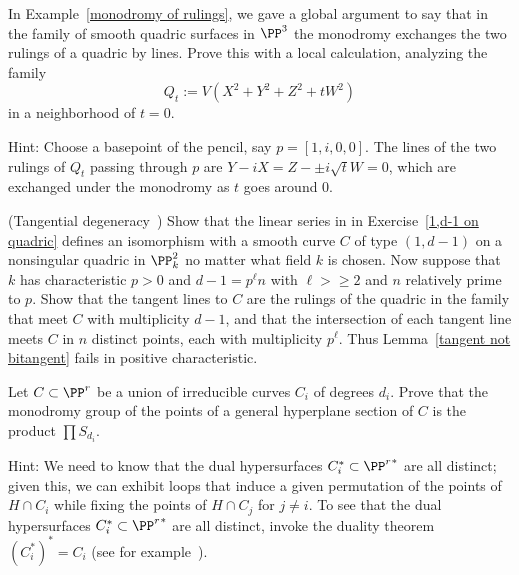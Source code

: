 \begin{exercise}
In Example~\ref{monodromy of rulings}, we gave a global argument to say that in the family of smooth quadric surfaces in $\PP^3$ the monodromy exchanges the two rulings of a quadric by lines. Prove this with a local calculation, analyzing the family
$$
Q_t := V(X^2+Y^2+Z^2 + tW^2)
$$
in a neighborhood of $t=0$.

Hint: Choose a basepoint of the pencil, say $p = [1, i, 0, 0]$. The lines of the two rulings of $Q_t$ passing through $p$ are
$Y-iX = Z-\pm i\sqrt{t}W = 0$, which are exchanged under the monodromy as $t$ goes around 0.
\end{exercise}

\begin{exercise}(Tangential degeneracy~\cite[Example 4.1]{kaji-tangentialDegeneracy})\label{kaji}
Show that the linear series in in Exercise~\ref{1,d-1 on quadric}
defines an isomorphism with a smooth curve $C$ of type $(1, d-1)$ on a nonsingular quadric in $\PP^2_k$ no matter what field $k$ is chosen. Now suppose that  $k$ has characteristic $p>0$ and $d-1 = p^\ell n$ with $\ell>\geq 2$ and $n$ relatively prime to $p$.
Show that the tangent lines to $C$ are the rulings of the quadric in the family that meet $C$ with multiplicity $d-1$, and that the intersection of each tangent line meets $C$ in $n$ distinct points, each with multiplicity $p^\ell$. Thus Lemma~\ref{tangent not bitangent}
fails in positive characteristic.
\end{exercise}

\begin{exercise}
Let $C \subset \PP^r$ be a union of irreducible curves $C_i$ of degrees $d_i$. Prove that the monodromy group of the points of a general hyperplane section of $C$ is the product $\prod S_{d_i}$.
\end{exercise}

Hint: We need to know that the dual hypersurfaces $C_i^* \subset {\PP^r}^*$ are all distinct; given this, we can exhibit loops that induce a given permutation of the points of $H \cap C_i$ while fixing the points of $H \cap C_j$ for $j \neq i$. To see that the dual hypersurfaces $C_i^* \subset {\PP^r}^*$ are all distinct, invoke the duality theorem $(C_i^*)^* = C_i$ (see for example~\cite{3264}).

